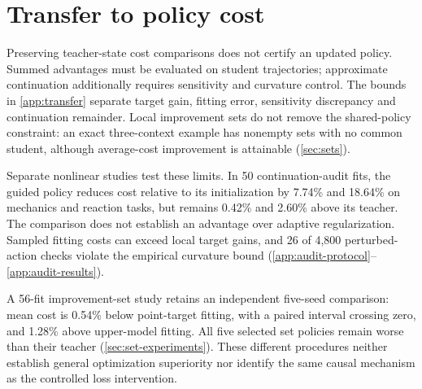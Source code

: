 \section{Transfer to policy cost}\label{sec:transfer-limits}
Preserving teacher-state cost comparisons does not certify an updated
policy. Summed advantages must be evaluated on student trajectories;
approximate continuation additionally requires sensitivity and curvature
control. The bounds in \ref{app:transfer} separate target gain, fitting
error, sensitivity discrepancy and continuation remainder. Local
improvement sets do not remove the shared-policy constraint: an exact
three-context example has nonempty sets with no common student,
although average-cost improvement is attainable (\ref{sec:sets}).

Separate nonlinear studies test these limits. In 50 continuation-audit
fits, the guided policy reduces cost relative to its initialization by
7.74\% and 18.64\% on mechanics and reaction tasks, but remains 0.42\%
and 2.60\% above its teacher. The comparison does not establish an
advantage over adaptive regularization. Sampled fitting costs can exceed local target gains,
and 26 of 4,800 perturbed-action checks violate the empirical curvature
bound (\ref{app:audit-protocol}--\ref{app:audit-results}).

A 56-fit improvement-set study retains an independent five-seed
comparison: mean cost is 0.54\% below point-target fitting, with a
paired interval crossing zero, and 1.28\% above upper-model fitting.
All five selected set policies remain worse than their teacher
(\ref{sec:set-experiments}). These different procedures neither
establish general optimization superiority nor identify the same
causal mechanism as the controlled loss intervention.
